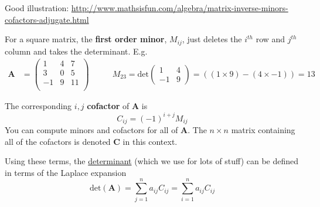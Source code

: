 \documentclass[12pt]{article}
\newcommand{\ve}[1]{\ensuremath{\mathbf{#1}}}
\begin{document}
Good illustration: \href{http://www.mathsisfun.com/algebra/matrix-inverse-minors-cofactors-adjugate.html}{http://www.mathsisfun.com/algebra/matrix-inverse-minors-cofactors-adjugate.html}


For a square matrix, the \textbf{first order minor}, $M_{ij}$, just deletes the $i^{th}$ row and $j^{th}$ column and takes the determinant. E.g.
%
\begin{align}
    \ve{A} &= \begin{pmatrix}
        1 & 4 & 7 \\
        3 & 0 & 5 \\
        -1 & 9 & 11 \\
    \end{pmatrix} 
    \qquad
    &M_{23} = \text{det}\begin{pmatrix}
       1 & 4 \\
       -1 & 9 
    \end{pmatrix}   
    = ((1 \times 9) - (4 \times -1)) = 13 \nonumber
\end{align} 

The corresponding $i,j$ \textbf{cofactor} of $\ve{A}$ is
%
\begin{equation}
C_{ij} = (-1)^{i+j} M_{ij} \nonumber
\end{equation}
%
You can compute minors and cofactors for all of $\ve{A}$. The $n \times n$ matrix containing all of the cofactors is denoted $\ve{C}$ in this context.

Using these terms, the \underline{determinant} (which we use for lots of stuff) can be defined in terms of the Laplace expansion
%
\begin{equation}
\text{det}(\ve{A}) = \sum_{j=1}^n a_{ij} C_{ij} = \sum_{i=1}^n a_{ij} C_{ij} \nonumber
\end{equation}
\end{document}
